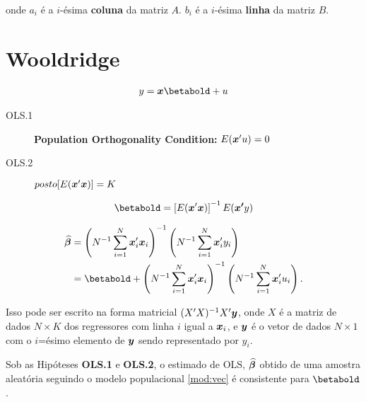 \documentclass[11pt,oneside,a4paper]{article}
\numberwithin{equation}{section}
\begin{document}
\noindent
onde
$a_{i}$ é a $i$-ésima \textbf{coluna} da matriz $A$.
$b_{i}$ é a $i$-ésima \textbf{linha} da matriz $B$.

\clearpage
\section{Wooldridge}
\noindent
\citet[Sec. 4.2.1 -- Consistency; p.52-4]{wool-2010}

\begin{align} \label{mod:vec}
	y = \mbs{x} \betabold + u
\end{align}

\begin{description}
	\item[OLS.1] \textbf{Population Orthogonality Condition:}  $E(\boldsymbol{x}'u) = 0$
	\item[OLS.2]  $posto[ E( \boldsymbol{x}' \boldsymbol{x} ) ] = K$
\end{description}

\vspace{-1 em}
\begin{align*}
	\betabold = \left[ E(\mbs{x}'\mbs{x}) \right]^{-1} E(\mbs{x'}y)
\end{align*}

\vspace{-1 em}
\begin{align*}
\betahatbold 
&=
\left( N^{-1} \sum_{i=1}^{N} \mbs{x}_{i}' \mbs{x}_{i} \right)^{-1} 
\left( N^{-1} \sum_{i=1}^{N} \mbs{x}_{i}' y_{i} \right)
\\
&=
\betabold +
\left( N^{-1} \sum_{i=1}^{N} \mbs{x}_{i}' \mbs{x}_{i} \right)^{-1} 
\left( N^{-1} \sum_{i=1}^{N} \mbs{x}_{i}' u_{i} \right).
\end{align*}

\noindent
Isso pode ser escrito na forma matricial $(X'X)^{-1}X' \boldsymbol{y}$, onde $X$ é a matriz de dados $N \times K$ dos regressores com linha $i$ igual a $\boldsymbol{x}_{i}$, e $\boldsymbol{y}$ é o vetor de dados $N \times 1$ com o $i$=ésimo elemento de $\boldsymbol{y}$ sendo representado por $y_{i}$.

\begin{teo1}
	Sob as Hipóteses \textbf{OLS.1} e \textbf{OLS.2}, o estimado de OLS, $\widehat{\boldsymbol{\beta}}$ obtido de uma amostra aleatória seguindo o modelo populacional \eqref{mod:vec} é consistente para $\betabold$.
\end{teo1}
\end{document}
